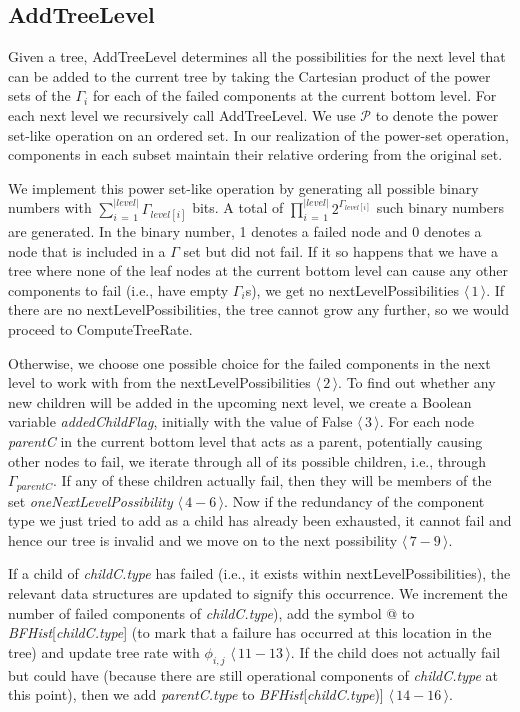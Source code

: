 \documentclass[12pt]{article}
\newcommand{\varName}[1]{\textrm{\it#1}}
\newcommand{\citeLine}[1]{$\langle \, #1 \, \rangle$}
\newcommand{\citeBlock}[2]{$\langle \, #1 - #2 \, \rangle$}
\begin{document}
\subsection{AddTreeLevel}

Given a tree, AddTreeLevel determines all the possibilities for the next level that can be added to the current tree by taking the Cartesian product of the power sets of the $\Gamma_{i}$ for each of the failed components at the current bottom level. For each next level we recursively call AddTreeLevel. We use $\mathcal{P}$ to denote the power set-like operation on an ordered set. In our realization of the power-set operation, components in each subset maintain their relative ordering from the original set.

We implement this power set-like operation by generating all possible binary numbers with $\sum\limits_{i \, = \, 1}^{|level|}\Gamma_{level[i]}$ bits. A total of $\prod\limits_{i \, = \, 1}^{|level|}2^{\Gamma_{level[i]}}$ such binary numbers are generated. In the binary number, 1 denotes a failed node and 0 denotes a node that is included in a $\Gamma$ set but did not fail. If it so happens that we have a tree where none of the leaf nodes at the current bottom level can cause any other components to fail (i.e., have empty $\Gamma_{i}$s), we get no nextLevelPossibilities \citeLine{1}. If there are no nextLevelPossibilities, the tree cannot grow any further, so we would proceed to ComputeTreeRate. 

Otherwise, we choose one possible choice for the failed components in the next level to work with from the nextLevelPossibilities \citeLine{2}. To find out whether any new children will be added in the upcoming next level, we create a Boolean variable \varName{addedChildFlag}, initially with the value of False \citeLine{3}. For each node \varName{parentC} in the current bottom level that acts as a parent, potentially causing other nodes to fail, we iterate through all of its possible children, i.e., through $\Gamma_{parentC}$. If any of these children actually fail, then they will be members of the set \varName{oneNextLevelPossibility} \citeBlock{4}{6}. Now if the redundancy of the component type we just tried to add as a child has already been exhausted, it cannot fail and hence our tree is invalid and we move on to the next possibility \citeBlock{7}{9}.

If a child of \varName{childC.type} has failed (i.e., it exists within nextLevelPossibilities), the relevant data structures are updated to signify this occurrence. We increment the number of failed components of \varName{childC.type}), add the symbol @ to \varName{BFHist}[\varName{childC.type}] (to mark that a failure has occurred at this location in the tree) and update tree rate with $\phi_{i, j}$ \citeBlock{11}{13}. If the child does not actually fail but could have (because there are still operational components of \varName{childC.type} at this point), then we add \varName{parentC.type} to \varName{BFHist}[\varName{childC.type})] \citeBlock{14}{16}.
\end{document}
